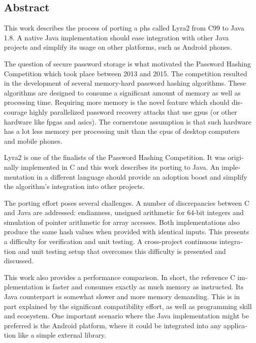 \cleardoublepage
{}

\begin{otherlanguage}{english}
\chapter*{Abstract}

This work describes the process of porting a \gls{phs} called Lyra2 from C99 to Java 1.8. A native Java implementation should ease integration with other Java projects and simplify its usage on other platforms, such as Android phones.

The question of secure password storage is what motivated the Password Hashing Competition which took place between 2013 and 2015. The competition resulted in the development of several memory-hard password hashing algorithms. These algorithms are designed to consume a significant amount of memory as well as processing time. Requiring more memory is the novel feature which should discourage highly parallelized password recovery attacks that use \glspl{gpu} (or other hardware like \glspl{fpga} and \glspl{asic}). The cornerstone assumption is that such hardware has a lot less memory per processing unit than the \glspl{cpu} of desktop computers and mobile phones.

Lyra2 is one of the finalists of the Password Hashing Competition. It was originally implemented in C and this work describes its porting to Java. An implementation in a different language should provide an adoption boost and simplify the algorithm's integration into other projects.

The porting effort poses several challenges. A number of discrepancies between C and Java are addressed: endianness, unsigned arithmetic for 64-bit integers and simulation of pointer arithmetic for array accesses. Both implementations also produce the same hash values when provided with identical inputs. This presents a difficulty for verification and unit testing. A cross-project continuous integration and unit testing setup that overcomes this difficulty is presented and discussed.

This work also provides a performance comparison. In short, the reference C implementation is faster and consumes exactly as much memory as instructed. Its Java counterpart is somewhat slower and more memory demanding. This is in part explained by the significant compatibility effort, as well as programming skill and ecosystem. One important scenario where the Java implementation might be preferred is the Android platform, where it could be integrated into any application like a simple external library.


\end{otherlanguage}
